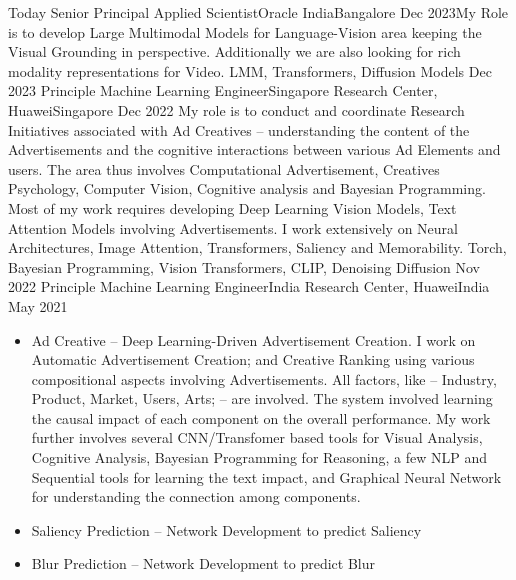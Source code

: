 %
%
%

\begin{experiences}
			\experience
	{Today} {Senior Principal Applied Scientist}{Oracle India}{Bangalore}
	{Dec 2023}{My Role is to develop Large Multimodal Models for Language-Vision area keeping the Visual Grounding in perspective. Additionally we are also looking for rich modality representations for Video.
	}
	{LMM, Transformers, Diffusion Models }
	\emptySeparator
		\experience
	{Dec 2023} {Principle Machine Learning Engineer}{Singapore Research Center, Huawei}{Singapore}
	{Dec 2022}{
		My role is to conduct and coordinate Research Initiatives associated with Ad Creatives -- understanding the content of the Advertisements and the cognitive interactions between various Ad Elements and users. The area thus involves Computational Advertisement, Creatives Psychology, Computer Vision, Cognitive analysis and Bayesian Programming. Most of my work requires developing Deep Learning Vision Models, Text Attention Models involving Advertisements. I work extensively on Neural Architectures, Image Attention, Transformers, Saliency and Memorability.
	}
	{Torch, Bayesian Programming, Vision Transformers, CLIP, Denoising Diffusion }
	\emptySeparator
	\experience
	{Nov 2022} {Principle Machine Learning Engineer}{India Research Center, Huawei}{India}
	{May 2021}{
		\begin{itemize}
			\item Ad Creative -- Deep Learning-Driven Advertisement Creation. I work on Automatic Advertisement Creation; and Creative Ranking using various compositional aspects involving Advertisements. All factors, like -- Industry, Product, Market, Users, Arts; -- are involved. The system involved learning the causal impact of each component on the overall performance. My work further involves several CNN/Transfomer based tools for Visual Analysis, Cognitive Analysis, Bayesian Programming for Reasoning, a few NLP and Sequential tools for learning the text impact, and Graphical Neural Network for understanding the connection among components.
			\item Saliency Prediction -- Network Development to predict Saliency
			\item Blur Prediction -- Network Development to predict Blur

\end{itemize}}
\end{experiences}
